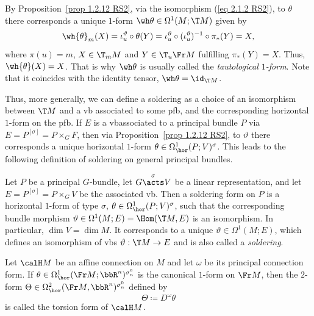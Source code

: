 \begin{rem}
    By Proposition~\ref{prop 1.2.12 RS2}, via the isomorphism (\ref{eq 2.1.2 RS2}), to $\theta$ there corresponds a unique $1$-form $\wh\theta\in\Omega^1(M;\T M)$ given by
    \[\wh{\theta}_m(X)=\iota_u^\vartheta\circ \theta(Y)=\iota_u^\vartheta\circ (\iota_u^\vartheta)^{-1}\circ\pi_\ast(Y)=X,\]
    where $\pi(u)=m$, $X\in \T_mM$ and $Y\in \T_u\Fr M$ fulfilling $\pi_\ast(Y)=X$. Thus, $\wh{\theta}(X)=X$. That is why $\wh\theta$ is usually called the \emph{tautological $1$-form}. Note that it coincides with the identity tensor, $\wh\theta=\id_{\T M}$.
\end{rem}

Thus, more generally, we can define a soldering as a choice of an isomorphism between $\T M$ and a \gls{vb} associated to some \gls{pfb}, and the corresponding horizontal $1$-form on the \gls{pfb}. If $E$ is a \gls{vb}associated to a principal bundle $P$ via $E=P^{[\sigma]}=P\times_G F$, then via Proposition~\ref{prop 1.2.12 RS2}, to $\vartheta$ there corresponds a unique horizontal $1$-form $\theta\in\Omega^1_{\hor}(P;V)^\sigma$. This leads to the following definition of soldering on general principal bundles.

\begin{defn}\label{def soldering on pfb}
    Let $P$ be a principal $G$-bundle, let $G\overset{\sigma}{\acts}V$ be a linear representation, and let $E=P^{[\sigma]}=P\times_G V$ be the associated \gls{vb}. Then a soldering form on $P$ is a horizontal $1$-form of type $\sigma$, $\theta\in\Omega^1_{\hor}(P;V)^\sigma$, such that the corresponding bundle morphism $\vartheta\in \Omega^1(M;E)=\Hom(\T M,E)$ is an isomorphism. In particular, $\dim V=\dim M$. It corresponds to a unique $\vartheta\in\Omega^1(M; E)$, which defines an isomorphism of \glspl{vb} $\vartheta:\T M\to E$ and is also called a \emph{soldering}.
\end{defn}


\begin{defn}
    Let $\calH M$ be an affine connection on $M$ and let $\omega$ be its principal connection form. If $\theta\in\Omega^1_{\hor}(\Fr M;\bbR^n)^{\sigma_n^0}$ is the canonical $1$-form on $\Fr M$, then the $2$-form $\Theta\in\Omega^2_{\hor}(\Fr M,\bbR^n)^{\sigma_n^0}$ defined by
    \[\Theta\coloneqq D^\omega\theta\label{eq 2.1.10 RS2}\]
    is called the torsion form of $\calH M$.
\end{defn}

